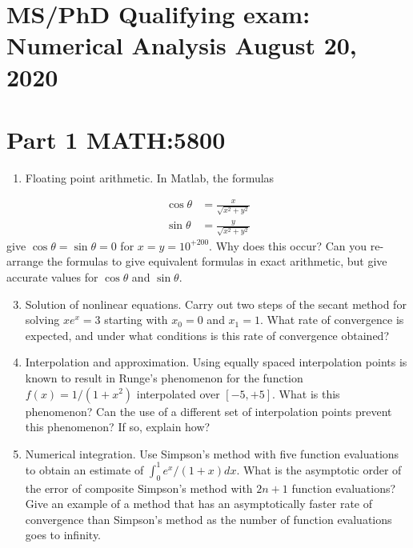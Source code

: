 \documentclass[10pt]{article}
\begin{document}
\section*{MS/PhD Qualifying exam: Numerical Analysis August 20, 2020 }


\section*{Part 1 MATH:5800 }
\begin{enumerate}
  \item Floating point arithmetic. In Matlab, the formulas
\end{enumerate}
$$
\begin{aligned}
\cos \theta &=\frac{x}{\sqrt{x^{2}+y^{2}}} \\
\sin \theta &=\frac{y}{\sqrt{x^{2}+y^{2}}}
\end{aligned}
$$
give $\cos \theta=\sin \theta=0$ for $x=y=10^{+200}$. Why does this occur? Can you re-arrange the formulas to give equivalent formulas in exact arithmetic, but give accurate values for $\cos \theta$ and $\sin \theta$.

\begin{enumerate}
  \setcounter{enumi}{2}
  \item Solution of nonlinear equations. Carry out two steps of the secant method for solving $x e^{x}=3$ starting with $x_{0}=0$ and $x_{1}=1$. What rate of convergence is expected, and under what conditions is this rate of convergence obtained?

  \item Interpolation and approximation. Using equally spaced interpolation points is known to result in Runge's phenomenon for the function $f(x)=1 /\left(1+x^{2}\right)$ interpolated over $[-5,+5]$. What is this phenomenon? Can the use of a different set of interpolation points prevent this phenomenon? If so, explain how?

  \item Numerical integration. Use Simpson's method with five function evaluations to obtain an estimate of $\int_{0}^{1} e^{x} /(1+x) d x$. What is the asymptotic order of the error of composite Simpson's method with $2 n+1$ function evaluations? Give an example of a method that has an asymptotically faster rate of convergence than Simpson's method as the number of function evaluations goes to infinity.

\end{enumerate}
\end{document}
